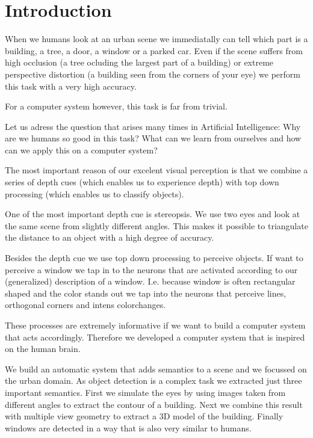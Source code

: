 \section{Introduction}
When we humans look at an urban scene we immediatally can tell which part is a
building, a tree, a door, a window or a parked car.
Even if the scene suffers from high occlusion (a tree ocluding the largest part
of a building) or extreme perspective distortion (a building seen from the
corners of your eye) we perform this task with a very high accuracy.

For a computer system however, this task is far from trivial.

Let us adress the question that arises many times in Artificial Intelligence:
Why are we humans so good in this task? What can we learn from ourselves 
and how can we apply this on a computer system?

The most important reason of our excelent visual perception is that we combine 
a series of depth cues (which enables us to experience depth) with top down processing (which
enables us to classify objects).

One of the most important depth cue is stereopsis.  We use two eyes and look at
the same scene from slightly different angles.  This makes it possible to
triangulate the distance to an object with a high degree of accuracy. 

Besides the depth cue we use top down processing to perceive objects.  If want
to perceive a window we tap in to the neurons that are activated according to
our (generalized) description of a window.  I.e. because window is often
rectangular shaped and the color stands out we tap into the neurons that
perceive lines, orthogonal corners and intens colorchanges.

These processes are extremely informative if we want to build a computer system
that acts accordingly.  Therefore we developed a computer system that is
inspired on the human brain.

We build an automatic system that adds semantics to a scene and we focussed on
the urban domain. As object detection is a complex task we extracted just
three important semantics.  First we simulate the eyes by using images taken from
different angles to extract the contour of a building. Next we combine this
result with multiple view geometry to extract a 3D model of the building. Finally
windows are detected in a way that is also very similar to humans.


